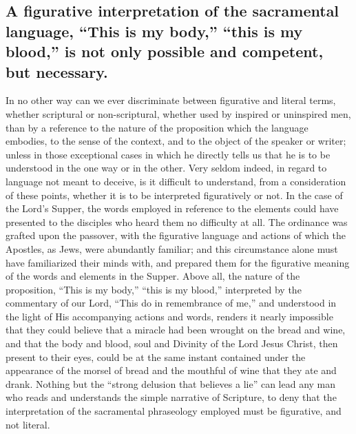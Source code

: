 \documentclass[]{book}
\begin{document}
\hypertarget{a-figurative-interpretation-of-the-sacramental-language-this-is-my-body-this-is-my-blood-is-not-only-possible-and-competent-but-necessary.}{%
\subsection{A figurative interpretation of the sacramental language, ``This is my body,'' ``this is my blood,'' is not only possible and competent, but necessary.}\label{a-figurative-interpretation-of-the-sacramental-language-this-is-my-body-this-is-my-blood-is-not-only-possible-and-competent-but-necessary.}}

In no other way can we ever discriminate between figurative and literal terms, whether scriptural or non-scriptural, whether used by inspired or uninspired men, than by a reference to the nature of the proposition which the language embodies, to the sense of the context, and to the object of the speaker or writer; unless in those exceptional cases in which he directly tells us that he is to be understood in the one way or in the other. Very seldom indeed, in regard to language not meant to deceive, is it difficult to understand, from a consideration of these points, whether it is to be interpreted figuratively or not. In the case of the Lord's Supper, the words employed in reference to the elements could have presented to the disciples who heard them no difficulty at all. The ordinance was grafted upon the passover, with the figurative language and actions of which the Apostles, as Jews, were abundantly familiar; and this circumstance alone must have familiarized their minds with, and prepared them for the figurative meaning of the words and elements in the Supper. Above all, the nature of the proposition, ``This is my body,'' ``this is my blood,'' interpreted by the commentary of our Lord, ``This do in remembrance of me,'' and understood in the light of His accompanying actions and words, renders it nearly impossible that they could believe that a miracle had been wrought on the bread and wine, and that the body and blood, soul and Divinity of the Lord Jesus Christ, then present to their eyes, could be at the same instant contained under the appearance of the morsel of bread and the mouthful of wine that they ate and drank. Nothing but the ``strong delusion that believes a lie'' can lead any man who reads and understands the simple narrative of Scripture, to deny that the interpretation of the sacramental phraseology employed must be figurative, and not literal.
\end{document}
